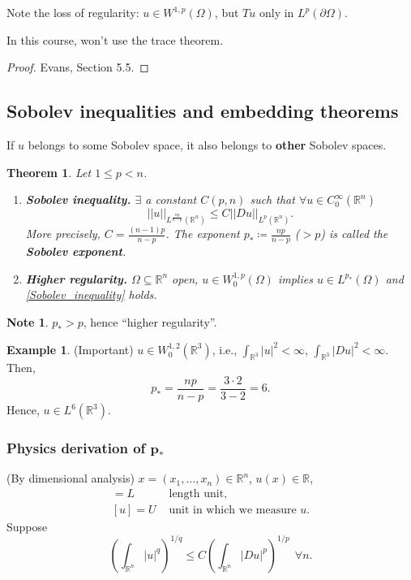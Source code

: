 \documentclass[12pt]{article}
\newtheorem{theorem}{Theorem}[section]
\theoremstyle{definition}
\newtheorem*{note}{Note}
\newtheorem*{example*}{Example}
\begin{document}
Note the loss of regularity: $u\in W^{1,p}(\Omega)$, but $Tu$ only in $L^p(\partial\Omega)$.

In this course, won't use the trace theorem.

\begin{proof}
\cite{evans2010partial} Evans, Section 5.5.
\end{proof}

\subsection{Sobolev inequalities and embedding theorems}
If $u$ belongs to some Sobolev space, it also belongs to \textbf{other} Sobolev spaces.

\begin{theorem}
Let $1\leq p<n$.
\begin{enumerate}[label=\alph*)]
\item \textbf{Sobolev inequality.} $\exists$ a constant $C(p,n)$ such that $\forall u\in C_0^\infty(\mathbb R^n)$
\begin{equation}\tag{S}\label{Sobolev_inequality}
||u||_{L^{\frac{np}{n-p}}(\mathbb R^n)}\leq C||Du||_{L^p(\mathbb R^n)}.
\end{equation}
More precisely, $C=\frac{(n-1)p}{n-p}$. The exponent $p_*\coloneqq\frac{np}{n-p}$ ($>p$) is called the \textbf{Sobolev exponent}.

\item \textbf{Higher regularity.} $\Omega\subseteq\mathbb R^n$ open, $u\in W_0^{1,p}(\Omega)$ implies $u\in L^{p_*}(\Omega)$ and \eqref{Sobolev_inequality} holds.
\end{enumerate}
\end{theorem}

\begin{note}
$p_*>p$, hence ``higher regularity''.
\end{note}

\begin{example*}
(Important) $u\in W_0^{1,2}(\mathbb R^3)$, i.e., $\int_{\mathbb R^3}|u|^2<\infty$, $\int_{\mathbb R^3}|Du|^2<\infty$. Then,
\[p_*=\frac{np}{n-p}=\frac{3\cdot2}{3-2}=6.\]
Hence, $u\in L^6(\mathbb R^3)$.
\end{example*}

\subsubsection*{Physics derivation of $\boldsymbol{p_*}$}
(By dimensional analysis) $x=(x_1,\ldots,x_n)\in\mathbb R^n$, $u(x)\in\mathbb R$,
\begin{align*}
[x_j]=L&\text{ length unit},\\
[u]=U&\text{ unit in which we measure }u.
\end{align*}
Suppose
\[\left(\int_{\mathbb R^n}|u|^q\right)^{1/q}\leq C\left(\int_{\mathbb R^n}|Du|^p\right)^{1/p}\ \ \forall n.\]
\end{document}
